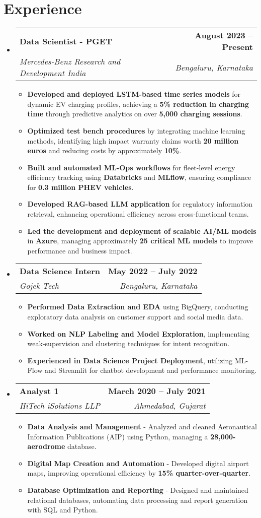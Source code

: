 \documentclass[letterpaper,11pt]{article}
\makeatletter
\newcommand{\resumeItem}[1]{
  \item\small{
    {#1 \vspace{-2pt}}
  }
}
\newcommand{\resumeSubheading}[4]{
  \vspace{-2pt}\item
    \begin{tabular*}{1.0\textwidth}[t]{l@{\extracolsep{\fill}}r}
      \textbf{#1} & \textbf{\small #2} \\
      \textit{\small#3} & \textit{\small #4} \\
    \end{tabular*}\vspace{-7pt}
}
\newcommand{\resumeSubHeadingListStart}{\begin{itemize}[leftmargin=0.0in, label={}]}
\newcommand{\resumeSubHeadingListEnd}{\end{itemize}}
\newcommand{\resumeItemListStart}{\begin{itemize}}
\newcommand{\resumeItemListEnd}{\end{itemize}\vspace{-5pt}}
\makeatother
\begin{document}
\section{Experience}

 \resumeSubHeadingListStart
    \resumeSubheading
      {Data Scientist - PGET}{August 2023 -- Present}
      {Mercedes-Benz Research and Development India}{Bengaluru, Karnataka}
      
    \resumeItemListStart 
    \resumeItem{\textbf{Developed and deployed LSTM-based time series models} for dynamic EV charging profiles, achieving a \textbf{5\% reduction in charging time} through predictive analytics on over \textbf{5,000 charging sessions}.}
    \resumeItem{\textbf{Optimized test bench procedures} by integrating machine learning methods, identifying high impact warranty claims worth \textbf{20 million euros} and reducing costs by approximately \textbf{10\%}.}
    \resumeItem{\textbf{Built and automated ML-Ops workflows} for fleet-level energy efficiency tracking using \textbf{Databricks} and \textbf{MLflow}, ensuring compliance for \textbf{0.3 million PHEV vehicles}.}
    \resumeItem{\textbf{Developed RAG-based LLM application} for regulatory information retrieval, enhancing operational efficiency across cross-functional teams.}
    \resumeItem{\textbf{Led the development and deployment of scalable AI/ML models} in \textbf{Azure}, managing approximately \textbf{25 critical ML models} to improve performance and business impact.}
    \resumeItemListEnd

    \resumeSubheading
        {Data Science Intern}{May 2022 -- July 2022}
        {Gojek Tech}{Bengaluru, Karnataka}
    \resumeItemListStart
    \resumeItem{\textbf{Performed Data Extraction and EDA} using BigQuery, conducting exploratory data analysis on customer support and social media data.}
    \resumeItem{\textbf{Worked on NLP Labeling and Model Exploration}, implementing weak-supervision and clustering techniques for intent recognition.}
    \resumeItem{\textbf{Experienced in Data Science Project Deployment}, utilizing ML-Flow and Streamlit for chatbot development and performance monitoring.}
    \resumeItemListEnd

    \resumeSubheading
      {Analyst 1}{March 2020 -- July 2021}
      {HiTech iSolutions LLP}{Ahmedabad, Gujarat}
      \resumeItemListStart
        \resumeItem{\textbf{Data Analysis and Management} - Analyzed and cleaned Aeronautical Information Publications (AIP) using Python, managing a \textbf{28,000-aerodrome} database.}
        \resumeItem{\textbf{Digital Map Creation and Automation} - Developed digital airport maps, improving operational efficiency by \textbf{15\% quarter-over-quarter}.}
        \resumeItem{\textbf{Database Optimization and Reporting} - Designed and maintained relational databases, automating data processing and report generation with SQL and Python.}
      \resumeItemListEnd  
\resumeSubHeadingListEnd
\end{document}
